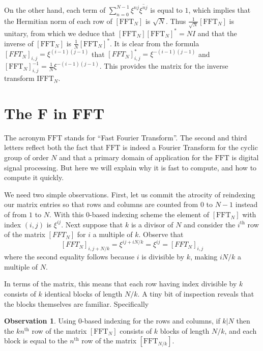 \documentclass[12pt, letter, oneside]{amsart}
\theoremstyle{definition}
\newtheorem{observation}[para]{Observation}
\theoremstyle{plain}
\numberwithin{equation}{para}
\numberwithin{figure}{section}
\newcommand{\FFT}{\text{FFT}}
\newcommand{\IFFT}{\text{IFFT}}
\renewcommand{\th}{\text{th}}
\begin{document}
On the other hand, each term of
$\sum_{n=0}^{N-1} \xi^{nj}\overline{\xi^{nj}}$ is equal to $1$, which
implies that the Hermitian norm of each row of $[\FFT_N]$ is
$\sqrt{N}$.  Thus $\frac{1}{\sqrt{N}}[\FFT_N]$ is unitary, from which
we deduce that $[\FFT_N][\FFT_N]^* = NI$ and that the inverse of
$[\FFT_N]$ is $\frac{1}{N}[\FFT_N]^*$.  It is clear from the formula
$[FFT_N]_{i,j} = \xi^{(i-1)(j-1)}$ that $[FFT_N]^*_{i,j} = \xi^{-(i-1)(j-1)}$
and $[\FFT_N]^{-1}_{i,j} = \frac{1}{N}\xi^{-(i-1)(j-1)}$.  This provides
the matrix for the inverse transform $\IFFT_N$.

\section{The F in FFT}

The acronym $\FFT$ stands for ``Fast Fourier Transform''.  The second and
third letters reflect both the fact that $\FFT$ is indeed a Fourier Transform
for the cyclic group of order $N$ and that a primary domain of application
for the $\FFT$ is digital signal processing.  But here we will explain why
it is fast to compute, and how to compute it quickly.

We need two simple observations.  First, let us commit the atrocity of
reindexing our matrix entries so that rows and columns are counted
from $0$ to $N-1$ instead of from $1$ to $N$.  With this $0$-based
indexing scheme the element of $[\FFT_N]$ with index $(i,j)$ is
$\xi^{ij}$.  Next suppose that $k$ is a divisor of $N$ and consider
the $i^\th$ row of the matrix $[FFT_N]$ for $i$ a multiple of $k$.
Observe that
$$[FFT_N]_{i,j+N/k} = \xi^{ij + iN/k} = \xi^{ij} = [FFT_N]_{i,j}$$
where the second equality follows because $i$ is divisible by $k$, making
$iN/k$ a multiple of $N$.

In terms of the matrix, this means that each row having index divisible
by $k$ consists of $k$ identical blocks of length $N/k$.  A tiny bit of
inspection reveals that the blocks themselves are familiar.  Specifically

\begin{observation}\label{observation:block}
Using $0$-based indexing for the rows and columns, if $k|N$ then the
$kn^\th$ row of the matrix $[\FFT_N]$ consists of $k$ blocks of length
$N/k$, and each block is equal to the $n^\th$ row of the matrix
$[\FFT_{N/k}]$.
\end{observation}
\end{document}
